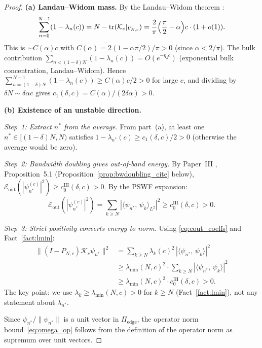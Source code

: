 \documentclass[12pt,a4paper]{amsart}
\theoremstyle{definition}
\newcommand{\Kop}{\mathcal{K}_c}
\newcommand{\ip}[2]{\langle #1,\, #2\rangle}
\newcommand{\Eout}{\mathcal{E}_{\mathrm{out}}}
\newcommand{\PN}{P_{N,c}}
\newcommand{\Pedge}{\Pi_{\mathrm{edge}}}
\newcommand{\lmin}{\lambda_{\min}(N,c)}
\begin{document}
\begin{proof}
\textbf{(a) Landau--Widom mass.}
By the Landau--Widom theorem \cite{Widom1964}:
\[
  \sum_{n=0}^{N-1}(1-\lambda_n(c))
  = N - \mathrm{tr}(\Kop|_{V_{N,c}})
  = \frac{2}{\pi}\Bigl(\frac{\pi}{2} - \alpha\Bigr)c\cdot(1+o(1)).
\]
This is $\sim C(\alpha)c$ with $C(\alpha) = 2(1-\alpha\pi/2)/\pi > 0$
(since $\alpha < 2/\pi$). The bulk contribution
$\sum_{n < (1-\delta)N}(1-\lambda_n(c)) = O(e^{-\eta_\delta c})$
(exponential bulk concentration, Landau--Widom).
Hence
$\sum_{n=(1-\delta)N}^{N-1}(1-\lambda_n(c))
\ge C(\alpha)c/2 > 0$
for large $c$, and dividing by $\delta N \sim \delta\alpha c$ gives
$c_1(\delta,c) = C(\alpha)/(2\delta\alpha) > 0$.

\textbf{(b) Existence of an unstable direction.}

\emph{Step~1: Extract $n^*$ from the average.}
From part~(a), at least one
$n^* \in [(1-\delta)N, N)$ satisfies
$1-\lambda_{n^*}(c) \ge c_1(\delta,c)/2 > 0$
(otherwise the average would be zero).

\emph{Step~2: Bandwidth doubling gives out-of-band energy.}
By Paper~III \cite{PaperIII}, Proposition~5.1
(Proposition~\ref{prop:bwdoubling_cite} below),
$\Eout(|\psi_{n^*}^{(c)}|^2) \ge c_0^{\mathrm{III}}(\delta,c) > 0$.
By the PSWF expansion:
\begin{equation}\label{eq:eout_coeffs}
  \Eout(|\psi_{n^*}^{(c)}|^2)
  = \sum_{k\ge N}|\ip{\psi_{n^*}}{\psi_k}_{L^2}|^2
  \ge c_0^{\mathrm{III}}(\delta,c) > 0.
\end{equation}

\emph{Step~3: Strict positivity converts energy to norm.}
Using \eqref{eq:eout_coeffs} and Fact~\ref{fact:lmin}:
\begin{align*}
  \|(I-\PN)\Kop\psi_{n^*}\|^2
  &= \sum_{k\ge N}\lambda_k(c)^2\,|\ip{\psi_{n^*}}{\psi_k}|^2 \\
  &\ge \lmin^2 \cdot \sum_{k\ge N}|\ip{\psi_{n^*}}{\psi_k}|^2 \\
  &\ge \lmin^2 \cdot c_0^{\mathrm{III}}(\delta,c) > 0.
\end{align*}
The key point: we use $\lambda_k \ge \lmin > 0$ for $k \ge N$
(Fact~\ref{fact:lmin}), not any statement about $\lambda_{n^*}$.

Since $\psi_{n^*}/\|\psi_{n^*}\|$ is a unit vector in $\Pedge$,
the operator norm bound~\eqref{eq:omega_op} follows from the
definition of the operator norm as supremum over unit vectors.
\end{proof}
\end{document}
